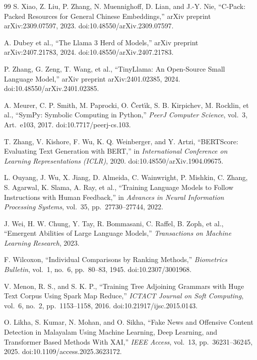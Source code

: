\documentclass[a4paper,fleqn]{cas-sc}
\begin{document}
\begin{thebibliography}{99}
S. Xiao, Z. Liu, P. Zhang, N. Muennighoff, D. Lian, and J.-Y. Nie,
``C-Pack: Packed Resources for General Chinese Embeddings,''
arXiv preprint arXiv:2309.07597,
2023.
doi:10.48550/arXiv.2309.07597.

A. Dubey et al.,
``The Llama 3 Herd of Models,''
arXiv preprint arXiv:2407.21783,
2024.
doi:10.48550/arXiv.2407.21783.

P. Zhang, G. Zeng, T. Wang, et al.,
``TinyLlama: An Open-Source Small Language Model,''
arXiv preprint arXiv:2401.02385,
2024.
doi:10.48550/arXiv.2401.02385.

A. Meurer, C. P. Smith, M. Paprocki, O. {\v{C}}ert{\'\i}k, S. B. Kirpichev, M. Rocklin, et al.,
``SymPy: Symbolic Computing in Python,''
\textit{PeerJ Computer Science},
vol.~3,
Art.~e103,
2017.
doi:10.7717/peerj-cs.103.

T. Zhang, V. Kishore, F. Wu, K. Q. Weinberger, and Y. Artzi,
``BERTScore: Evaluating Text Generation with BERT,''
in \textit{International Conference on Learning Representations (ICLR)},
2020.
doi:10.48550/arXiv.1904.09675.

L. Ouyang, J. Wu, X. Jiang, D. Almeida, C. Wainwright,
P. Mishkin, C. Zhang, S. Agarwal, K. Slama, A. Ray, et al.,
``Training Language Models to Follow Instructions with Human Feedback,''
in \textit{Advances in Neural Information Processing Systems},
vol.~35,
pp.~27730--27744,
2022.

J. Wei, H. W. Chung, Y. Tay, R. Bommasani, C. Raffel,
B. Zoph, et al.,
``Emergent Abilities of Large Language Models,''
\textit{Transactions on Machine Learning Research},
2023.

F. Wilcoxon,
``Individual Comparisons by Ranking Methods,''
\textit{Biometrics Bulletin},
vol.~1,
no.~6,
pp.~80--83,
1945.
doi:10.2307/3001968.

V. Menon, R. S., and S. K. P.,
``Training Tree Adjoining Grammars with Huge Text Corpus Using Spark Map Reduce,''
\textit{ICTACT Journal on Soft Computing},
vol.~6,
no.~2,
pp.~1153--1158,
2016.
doi:10.21917/ijsc.2015.0143.

O. Likha, S. Kumar, N. Mohan, and O. Sikha,
``Fake News and Offensive Content Detection in Malayalam Using Machine Learning, Deep Learning, and Transformer Based Methods With XAI,''
\textit{IEEE Access},
vol.~13,
pp.~36231--36245,
2025.
doi:10.1109/access.2025.3623172.


\end{thebibliography}
\end{document}
